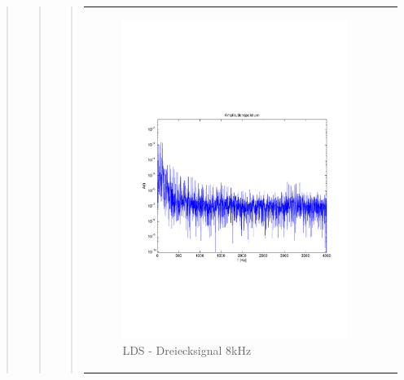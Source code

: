 \begin{quote}
\begin{quote}
\begin{quote}
\begin{center}
\begin{tabular}{ll}
            \hspace{-4cm}
                
                \begin{minipage}{0.55\textwidth}
                    \begin{figure}[H]
                        \includegraphics[scale=0.4, trim = 1.5cm 7cm 1.5cm 8cm, clip]
                        {./Bilder/drei8_Quantisierungsfehler_LDS}
                          \caption{LDS - Dreiecksignal 8kHz}
                    \end{figure}
                \end{minipage}
                              

\end{tabular}
\end{center}
\end{quote}
\end{quote}
\end{quote}
